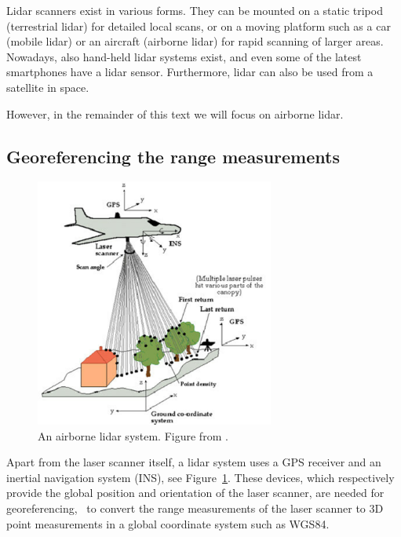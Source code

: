 Lidar scanners exist in various forms. 
They can be mounted on a static tripod (terrestrial lidar) for detailed local scans, or on a moving platform such as a car (mobile lidar) or an aircraft (airborne lidar) for rapid scanning of larger areas. Nowadays, also hand-held lidar systems exist, and even some of the latest smartphones  have a lidar sensor. 
Furthermore, lidar can also be used from a satellite in space. 

However, in the remainder of this text we will focus on airborne lidar.


%
\subsection{Georeferencing the range measurements}

\begin{figure}
	\centering
	\includegraphics[width=0.7\textwidth]{figs/lidar-gnss-imu.png}
	\caption{An airborne lidar system. Figure from \citet{Dowman04}.}%
\label{fig:airborne-lidar}
\end{figure}
Apart from the  laser scanner itself, a lidar  system uses a GPS receiver and an inertial navigation system (INS), see Figure~\ref{fig:airborne-lidar}. 
These devices, which respectively provide the global position and orientation of the laser scanner, are needed for georeferencing, \ie\ to convert the range measurements of the laser scanner to 3D point measurements in a global coordinate system such as WGS84. 

